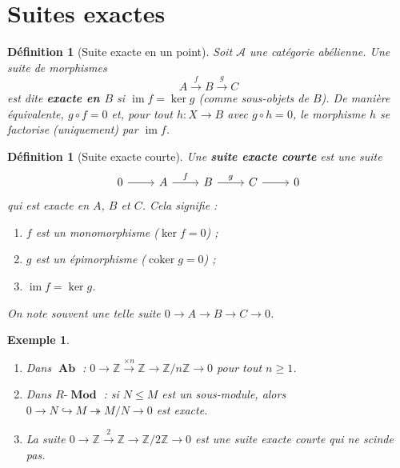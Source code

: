 \documentclass[a4paper,12pt]{book}
\DeclareMathOperator{\im}{im}
\DeclareMathOperator{\coker}{coker}
\DeclareMathOperator{\Ab}{\mathbf{Ab}}
\DeclareMathOperator{\Mod}{\mathbf{Mod}}
\newcommand{\Z}{\mathbb{Z}}
\newtheorem{definition}[theoreme]{Définition}
\newtheorem{exemple}[theoreme]{Exemple}
\begin{document}
\section{Suites exactes}\label{sec:exact-sequences}

\begin{definition}[Suite exacte en un point]\label{def:exact-at}
Soit $\mathcal{A}$ une catégorie abélienne. Une suite de morphismes
\[
  A \xrightarrow{f} B \xrightarrow{g} C
\]
est dite \textbf{exacte en $B$} si $\im f = \ker g$
(comme sous-objets de $B$).
De manière équivalente, $g \circ f = 0$ et, pour tout $h \colon X \to B$
avec $g \circ h = 0$, le morphisme $h$ se factorise (uniquement) par
$\im f$.
\end{definition}

\begin{definition}[Suite exacte courte]\label{def:ses}
Une \textbf{suite exacte courte} est une suite
\[
\begin{tikzcd}
0 \arrow[r] & A \arrow[r, "f"] & B \arrow[r, "g"] & C \arrow[r] & 0
\end{tikzcd}
\]
qui est exacte en $A$, $B$ et $C$. Cela signifie :
\begin{enumerate}[label=(\roman*)]
\item $f$ est un monomorphisme ($\ker f = 0$) ;
\item $g$ est un épimorphisme ($\coker g = 0$) ;
\item $\im f = \ker g$.
\end{enumerate}
On note souvent une telle suite $0 \to A \to B \to C \to 0$.
\end{definition}

\begin{exemple}\label{ex:ses-Z}
\begin{enumerate}[label=(\roman*)]
\item Dans $\Ab$ : $0 \to \Z \xrightarrow{\times n} \Z \to \Z/n\Z \to 0$
  pour tout $n \geq 1$.

\item Dans $R\text{-}\Mod$ : si $N \leq M$ est un sous-module, alors
  $0 \to N \hookrightarrow M \twoheadrightarrow M/N \to 0$ est exacte.

\item La suite $0 \to \Z \xrightarrow{2} \Z \to \Z/2\Z \to 0$
  est une suite exacte courte qui \emph{ne scinde pas}.
\end{enumerate}
\end{exemple}
\end{document}
